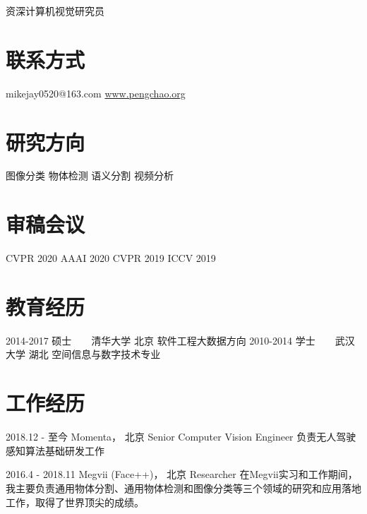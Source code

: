 \documentclass[]{friggeri-cv}
\begin{document}
       {资深计算机视觉研究员}

\begin{aside}
  \section{联系方式}
    mikejay0520@163.com
    \href{http://www.pengchao.org}{www.pengchao.org}
  \section{研究方向}
    图像分类
    物体检测
    语义分割
    视频分析
  \section{审稿会议}
    CVPR 2020
    AAAI 2020
    CVPR 2019
    ICCV 2019
\end{aside}

\section{教育经历}
\begin{entrylist}
  \entry
    {2014-2017}
    {硕士~~~~清华大学}
    {北京}
    {软件工程大数据方向}
  \entry
    {2010-2014}
    {学士~~~~武汉大学}
    {湖北}
    {空间信息与数字技术专业}
\end{entrylist}


\section{工作经历}
\begin{entrylist}
  \entry
    {2018.12 - 至今}
    {Momenta， 北京}
    {Senior Computer Vision Engineer}
    {负责无人驾驶感知算法基础研发工作}

  \entry
    {2016.4 - 2018.11 \qquad }
    {Megvii (Face++)， 北京}
    {Researcher}
    {在Megvii实习和工作期间，我主要负责通用物体分割、通用物体检测和图像分类等三个领域的研究和应用落地工作，取得了世界顶尖的成绩。}

\end{entrylist}
\end{document}
